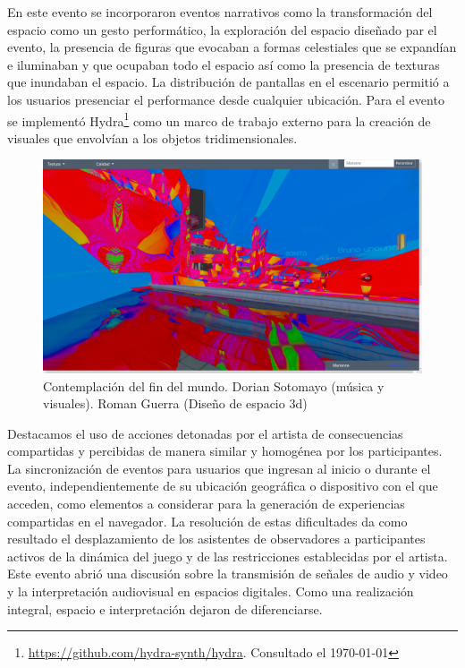 En este evento se incorporaron eventos narrativos como la transformación del espacio como un gesto performático, la exploración del espacio diseñado par el evento, la presencia de figuras que evocaban a formas celestiales que se expandían e iluminaban y que ocupaban todo el espacio así como la presencia de texturas que inundaban el espacio. La distribución de pantallas en el escenario  permitió a los usuarios presenciar el performance desde cualquier ubicación. Para el evento se implementó Hydra\footnote{\url{https://github.com/hydra-synth/hydra}. Consultado el \today} como un marco de trabajo externo para la creación de visuales que envolvían a los objetos tridimensionales.

\begin{figure}
  \includegraphics[width=\textwidth]{img/figura10.png}
  \caption{Contemplación del fin del mundo. Dorian Sotomayo (música y visuales). Roman Guerra (Diseño de espacio 3d) }
  \label{fig:contemplacion}
\end{figure}

Destacamos el uso de acciones detonadas por el artista de consecuencias compartidas y percibidas de manera similar y homogénea por los participantes. La sincronización de eventos para usuarios que ingresan al inicio o durante el evento, independientemente de su ubicación geográfica o dispositivo con el que acceden, como elementos a considerar para la generación de experiencias compartidas en el navegador. La resolución de estas dificultades da como resultado el desplazamiento de los asistentes de observadores a participantes activos de la dinámica del juego y de las restricciones establecidas por el artista. Este evento abrió una discusión sobre la transmisión de señales de audio y video y la interpretación audiovisual en espacios digitales. Como una realización integral, espacio e interpretación dejaron de diferenciarse. 


